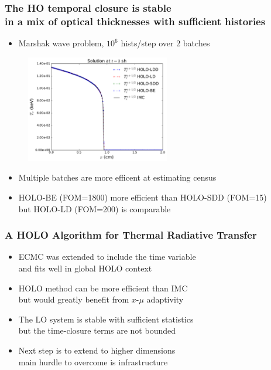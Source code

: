 \documentclass[xcolor=dvipsnames,hyperref={pdfpagelabels=false},unknownkeysallowed]{beamer}
\newcommand{\colG}[1]{{\color{Gray!110} #1}}
\newlength{\wideitemsep}
\let\olditem\item
\renewcommand{\item}{\setlength{\itemsep}{\wideitemsep}\olditem}
\newcommand{\shorttitle}{\color{black} A HOLO Algorithm for Thermal Radiative Transfer
    \makebox[\linewidth]{\rule{\textwidth}{5pt}}
}
\begin{document}
\begin{frame}
    \frametitle{The HO temporal closure is stable \\ in a mix of optical thicknesses with
    sufficient histories}
{\addtolength{\leftmargini}{-0.2in}
    \fontsize{9.0pt}{10.0pt}\selectfont
    \vspace{0.1in}
    \begin{itemize}
        \item Marshak wave problem, $10^6$ hists/step over 2 batches
    \end{itemize}
            \begin{figure}[H]
    \centering
    \includegraphics[width=0.56\textwidth]{marshak_time_cont_compare.pdf}
\end{figure}
\begin{itemize}
    \item Multiple batches are more efficent at estimating census
    \item HOLO-BE (FOM=1800) more efficient than HOLO-SDD (FOM=15) \\ but HOLO-LD (FOM=200) is comparable
    \end{itemize}
}
\end{frame}

\begin{frame}
    \frametitle{\shorttitle}
    \begin{itemize}
        \item[] ECMC was extended to include the time variable\\
            \colG{and fits well in global HOLO context}
        \item[] HOLO method can be more efficient than IMC \\
            \colG{but would greatly benefit from $x$-$\mu$ adaptivity}
        \item[] The LO system is stable with sufficient statistics \\
            \colG{but the time-closure terms are not bounded}
        \item[] Next step is to extend to higher dimensions \\
            \colG{main hurdle to overcome is infrastructure}
    \end{itemize}
\end{frame}
\end{document}
